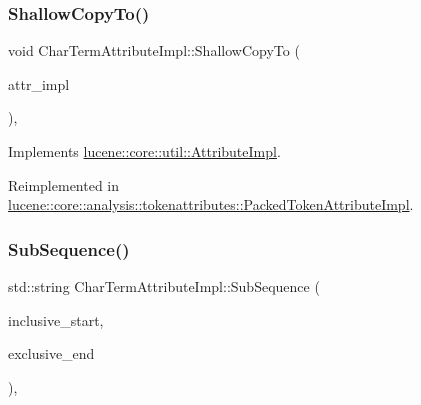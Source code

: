 \subsubsection{\texorpdfstring{Shallow\+Copy\+To()}{ShallowCopyTo()}}
{\footnotesize\ttfamily void Char\+Term\+Attribute\+Impl\+::\+Shallow\+Copy\+To (\begin{DoxyParamCaption}\item[{\mbox{\hyperlink{classlucene_1_1core_1_1util_1_1AttributeImpl}{lucene\+::core\+::util\+::\+Attribute\+Impl}} \&}]{attr\+\_\+impl }\end{DoxyParamCaption})\hspace{0.3cm}{\ttfamily [override]}, {\ttfamily [virtual]}}



Implements \mbox{\hyperlink{classlucene_1_1core_1_1util_1_1AttributeImpl_a010e8937832f53139c8fe42757476895}{lucene\+::core\+::util\+::\+Attribute\+Impl}}.



Reimplemented in \mbox{\hyperlink{classlucene_1_1core_1_1analysis_1_1tokenattributes_1_1PackedTokenAttributeImpl_ab89c820321f0f5b84c7a392bb8de32f3}{lucene\+::core\+::analysis\+::tokenattributes\+::\+Packed\+Token\+Attribute\+Impl}}.

\mbox{\label{classlucene_1_1core_1_1analysis_1_1tokenattributes_1_1CharTermAttributeImpl_a286d2dd38ce24fb0da4c077e8f06bb25}} 
\subsubsection{\texorpdfstring{Sub\+Sequence()}{SubSequence()}}
{\footnotesize\ttfamily std\+::string Char\+Term\+Attribute\+Impl\+::\+Sub\+Sequence (\begin{DoxyParamCaption}\item[{const uint32\+\_\+t}]{inclusive\+\_\+start,  }\item[{const uint32\+\_\+t}]{exclusive\+\_\+end }\end{DoxyParamCaption})\hspace{0.3cm}{\ttfamily [override]}, {\ttfamily [virtual]}}



